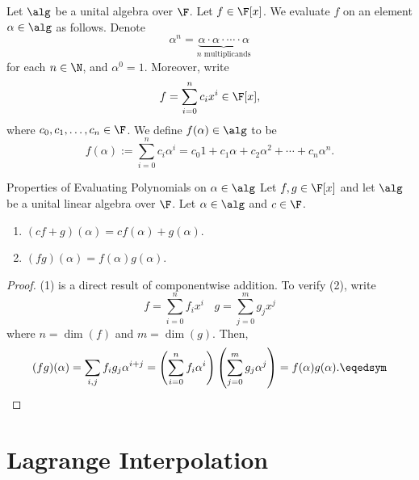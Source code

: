 \documentclass[linearalgebraII]{subfiles}
\begin{document}
    \begin{remark}
        Let $\alg$ be a unital algebra over $\F$. Let $f\in \F[x]$. We evaluate $f$ on an element $\alpha\in \alg$ as follows. Denote
        \begin{equation*}
            \alpha^n = \underbrace{\alpha\cdot\alpha\cdot\cdots\cdot\alpha}_{n\text{ multiplicands}}
        \end{equation*}
        for each $n\in \N$, and $\alpha^0 = 1$. Moreover, write
        \begin{equation*}
            f = \sum^n_{i=0} c_ix^i\in \F[x],
        \end{equation*}
        where $c_0, c_1, \ldots, c_n\in\F$. We define $f(\alpha)\in\alg$ to be
        \begin{equation*}
            f(\alpha) := \sum^n_{i=0} c_i\alpha^i = c_0 1 + c_1\alpha + c_2\alpha^2 + \cdots + c_n\alpha^n.
        \end{equation*}
    \end{remark}

    \begin{prop}{Properties of Evaluating Polynomials on $\alpha\in\alg$}
        Let $f,g\in \F[x]$ and let $\alg$ be a unital linear algebra over $\F$. Let $\alpha\in \alg$ and $c\in\F$.
        \begin{enumerate}
            \item $(cf+g)(\alpha) = cf(\alpha)+g(\alpha)$.
            \item $(fg)(\alpha) = f(\alpha)g(\alpha)$.
        \end{enumerate}
    \end{prop}

    \begin{proof}
        (1) is a direct result of componentwise addition. To verify (2), write
        \begin{equation*}
            f = \sum^n_{i=0} f_ix^i \ \ \ \ g = \sum^m_{j=0} g_jx^j
        \end{equation*}
        where $n = \dim(f)$ and $m = \dim(g)$. Then,
        \begin{equation*}
            (fg)(\alpha) = \sum_{i,j} f_ig_j\alpha^{i+j} = \left( \sum^n_{i=0} f_i\alpha^i \right)\left( \sum^m_{j=0} g_j\alpha^j \right) = f(\alpha)g(\alpha). \eqedsym
        \end{equation*}
    \end{proof}

    \section{Lagrange Interpolation}
\end{document}
